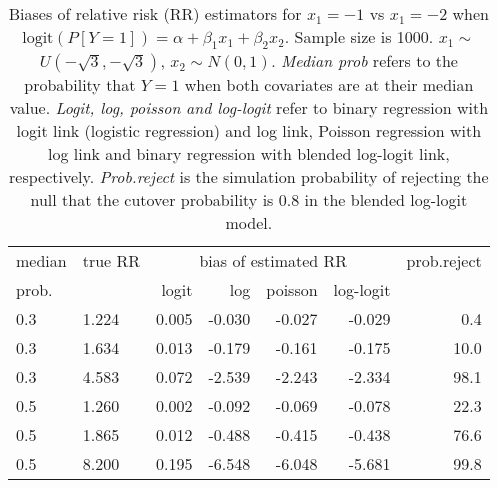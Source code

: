 \documentclass[12pt,a4paper]{article}
\begin{document}
\begin{table}[H] 
\small\sf\centering 
\caption{Biases of relative risk (RR) estimators for $x_1=-1$ vs $x_1=-2$ when $\mbox{logit}(P[Y=1])=\alpha+\beta_1 x_1 + \beta_2 x_2$. Sample size is 1000. $x_1 \sim $$U(-\sqrt{3},-\sqrt{3})$, $x_2 \sim N(0,1)$. {\it Median prob} refers to the probability that $Y=1$ when both covariates are at their median value. {\it Logit, log, poisson and log-logit} refer to binary regression with logit link (logistic regression) and log link, Poisson regression with log link and binary regression with blended log-logit link, respectively. {\it Prob.reject} is the simulation probability of rejecting the null that the cutover probability is $0.8$ in the blended log-logit model.} 
\begin{tabular}{llrrrrr} 
\toprule 
median & true RR & \multicolumn{4}{c}{bias of estimated RR} & prob.reject \\ 
prob. & & logit & log & poisson & log-logit  & \\ \midrule 
0.3 & 1.224 & 0.005 & -0.030 & -0.027 & -0.029 &  0.4 \\  
0.3 & 1.634 & 0.013 & -0.179 & -0.161 & -0.175 & 10.0 \\  
0.3 & 4.583 & 0.072 & -2.539 & -2.243 & -2.334 & 98.1 \\  
0.5 & 1.260 & 0.002 & -0.092 & -0.069 & -0.078 & 22.3 \\  
0.5 & 1.865 & 0.012 & -0.488 & -0.415 & -0.438 & 76.6 \\  
0.5 & 8.200 & 0.195 & -6.548 & -6.048 & -5.681 & 99.8 \\  
\bottomrule 
\end{tabular} 
\end{table} 
\end{document}
